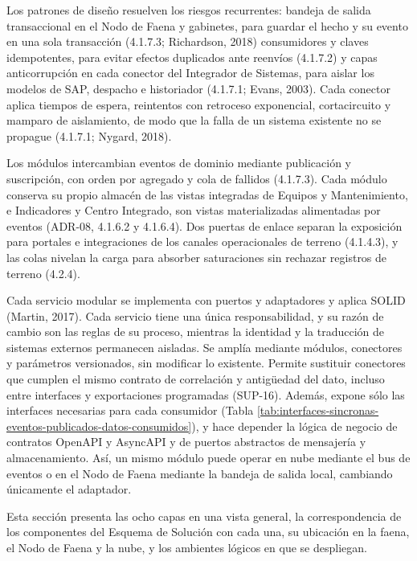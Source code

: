 \documentclass[subdoc]{../../comun/overfore}
\begin{document}
Los patrones de diseño resuelven los riesgos recurrentes: bandeja de salida transaccional en el Nodo de Faena y gabinetes, para guardar el hecho y su evento en una sola transacción (4.1.7.3; Richardson, 2018) consumidores y claves idempotentes, para evitar efectos duplicados ante reenvíos (4.1.7.2) y capas anticorrupción en cada conector del Integrador de Sistemas, para aislar los modelos de SAP, despacho e historiador (4.1.7.1; Evans, 2003). Cada conector aplica tiempos de espera, reintentos con retroceso exponencial, cortacircuito y mamparo de aislamiento, de modo que la falla de un sistema existente no se propague (4.1.7.1; Nygard, 2018).

Los módulos intercambian eventos de dominio mediante publicación y suscripción, con orden por agregado y cola de fallidos (4.1.7.3). Cada módulo conserva su propio almacén de las vistas integradas de Equipos y Mantenimiento, e Indicadores y Centro Integrado, son vistas materializadas alimentadas por eventos (ADR-08, 4.1.6.2 y 4.1.6.4). Dos puertas de enlace separan la exposición para portales e integraciones de los canales operacionales de terreno (4.1.4.3), y las colas nivelan la carga para absorber saturaciones sin rechazar registros de terreno (4.2.4).

Cada servicio modular se implementa con puertos y adaptadores y aplica SOLID (Martin, 2017). Cada servicio tiene una única responsabilidad, y su razón de cambio son las reglas de su proceso, mientras la identidad y la traducción de sistemas externos permanecen aisladas. Se amplía mediante módulos, conectores y parámetros versionados, sin modificar lo existente. Permite sustituir conectores que cumplen el mismo contrato de correlación y antigüedad del dato, incluso entre interfaces y exportaciones programadas (SUP-16). Además, expone sólo las interfaces necesarias para cada consumidor (Tabla \ref{tab:interfaces-sincronas-eventos-publicados-datos-consumidos}), y hace depender la lógica de negocio de contratos OpenAPI y AsyncAPI y de puertos abstractos de mensajería y almacenamiento. Así, un mismo módulo puede operar en nube mediante el bus de eventos o en el Nodo de Faena mediante la bandeja de salida local, cambiando únicamente el adaptador.

Esta sección presenta las ocho capas en una vista general, la correspondencia de los componentes del Esquema de Solución con cada una, su ubicación en la faena, el Nodo de Faena y la nube, y los ambientes lógicos en que se despliegan.
\end{document}

